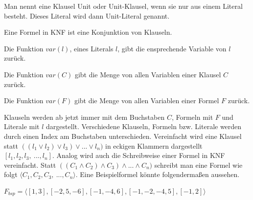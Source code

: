   \begin{definition}
    Man nennt eine Klausel Unit oder Unit-Klausel, wenn
    sie nur aus einem Literal besteht. Dieses Literal wird 
    dann Unit-Literal genannt.
  \end{definition}
  \begin{definition}
    Eine Formel in KNF ist eine Konjunktion von Klauseln.
  \end{definition}
  \begin{function}
    Die Funktion $var(l)$, eines Literals $l$, gibt die
    ensprechende Variable von $l$ zurück.

  \end{function}
  \begin{function}
    Die Funktion $var(C)$ gibt die Menge von allen Variablen
    einer Klausel $C$ zurück.
  \end{function}
  \begin{function}
    Die Funktion $var(F)$ gibt die Menge von allen Variablen
    einer Formel $F$ zurück.
  \end{function}
  Klauseln werden ab jetzt immer mit dem Buchstaben $C$,
  Formeln mit $F$ und Literale mit $l$ dargestellt.
  Verschiedene Klauseln, Formeln bzw. Literale werden durch
  einen Index am Buchstaben unterschieden. Vereinfacht wird 
  eine Klausel statt 
  $((l_1 \vee l_2)\vee l_3)\vee ...\vee l_n)$
  in eckigen Klammern dargestellt 
  $[l_1, l_2, l_3,\ ..., l_n]$. Analog wird auch die 
  Schreibweise einer Formel in KNF vereinfacht. Statt 
  $((C_1 \wedge C_2)\wedge C_3)\wedge ...\wedge C_n)$ 
  schreibt man eine Formel wie folgt 
  $\langle C_1, C_2, C_3,\ ..., C_n \rangle$. Eine 
  Beispielformel könnte folgendermaßen aussehen.
  \begin{center}
    $F_{bsp} = \langle [1,3],[-2, 5, -6], [-1,-4,6], [-1,-2,-4,5], [-1,2]\rangle$
  \end{center}

